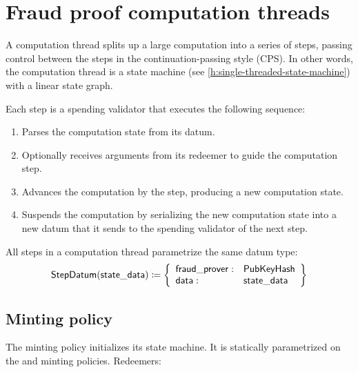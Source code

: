 \documentclass[../midgard.tex]{subfiles}
\begin{document}
\section{Fraud proof computation threads}
\label{h:fraud-proof-computation-threads}

A computation thread splits up a large computation into a series of steps, passing control between the steps in the continuation-passing style (CPS). In other words, the computation thread is a state machine (see \cref{h:single-threaded-state-machine}) with a linear state graph.

Each step is a spending validator that executes the following sequence:
\begin{enumerate}
    \item Parses the computation state from its datum.
    \item Optionally receives arguments from its redeemer to guide the computation step. 
    \item Advances the computation by the step, producing a new computation state.
    \item Suspends the computation by serializing the new computation state into a new datum that it sends to the spending validator of the next step.
\end{enumerate}

All steps in a computation thread parametrize the same datum type:
\begin{equation*}
    \mathsf{StepDatum} (\mathsf{state\_data}) \coloneq \left\{
    \begin{array}{ll}
        \mathsf{fraud\_prover}  : & \mathsf{PubKeyHash} \\
        \mathsf{data} : & \mathsf{state\_data}
    \end{array} \right\}
\end{equation*}

\subsection{Minting policy}
\label{h:fraud-proof-computation-threads-minting-policy}

The  minting policy initializes its state machine. It is statically parametrized on the  and  minting policies. Redeemers:
\end{document}
